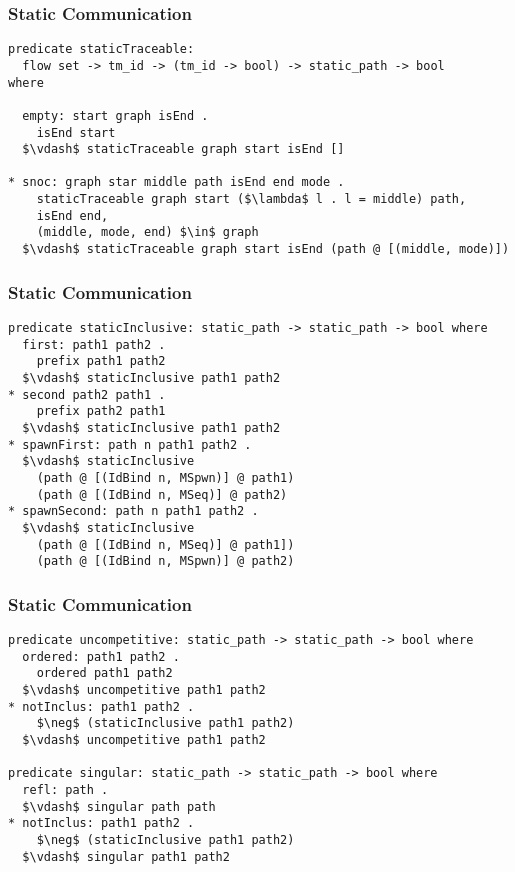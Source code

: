\documentclass{beamer}
\begin{document}
\begin{frame}[fragile]
	\frametitle{Static Communication}
\begin{lstlisting}[language=logic, mathescape]
predicate staticTraceable:
  flow set -> tm_id -> (tm_id -> bool) -> static_path -> bool
where

  empty: start graph isEnd .
    isEnd start
  $\vdash$ staticTraceable graph start isEnd []

* snoc: graph star middle path isEnd end mode .
    staticTraceable graph start ($\lambda$ l . l = middle) path, 
    isEnd end, 
    (middle, mode, end) $\in$ graph 
  $\vdash$ staticTraceable graph start isEnd (path @ [(middle, mode)])
\end{lstlisting}
\end{frame}




\begin{frame}[fragile]
	\frametitle{Static Communication}
\begin{lstlisting}[language=logic, mathescape]
predicate staticInclusive: static_path -> static_path -> bool where
  first: path1 path2 .
    prefix path1 path2
  $\vdash$ staticInclusive path1 path2
* second path2 path1 .
    prefix path2 path1
  $\vdash$ staticInclusive path1 path2
* spawnFirst: path n path1 path2 .
  $\vdash$ staticInclusive
    (path @ [(IdBind n, MSpwn)] @ path1)
    (path @ [(IdBind n, MSeq)] @ path2)
* spawnSecond: path n path1 path2 .
  $\vdash$ staticInclusive
    (path @ [(IdBind n, MSeq)] @ path1])
    (path @ [(IdBind n, MSpwn)] @ path2)
\end{lstlisting}
\end{frame}


\begin{frame}[fragile]
	\frametitle{Static Communication}
\begin{lstlisting}[language=logic, mathescape]
predicate uncompetitive: static_path -> static_path -> bool where
  ordered: path1 path2 .
    ordered path1 path2
  $\vdash$ uncompetitive path1 path2
* notInclus: path1 path2 .
    $\neg$ (staticInclusive path1 path2)
  $\vdash$ uncompetitive path1 path2

predicate singular: static_path -> static_path -> bool where
  refl: path .
  $\vdash$ singular path path
* notInclus: path1 path2 .
    $\neg$ (staticInclusive path1 path2)
  $\vdash$ singular path1 path2
\end{lstlisting}
\end{frame}
\end{document}
